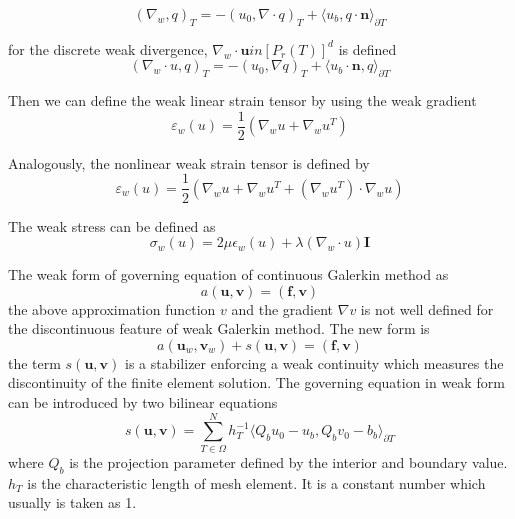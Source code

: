 \begin{equation}
(\nabla_{w}, q)_{T} = -(u_{0}, \nabla \cdot q)_{T} + \langle u_{b}, q \cdot \mathbf{n} \rangle_{\partial T}
\end{equation}

for the discrete weak divergence, $ \nabla_{w} \cdot \mathbf{u} in [P_{r} (T)]^{d} $ is defined 
\begin{equation}
(\nabla_w \cdot u, q)_{T} = -(u_{0}, \nabla q)_{T} + \langle u_{b} \cdot \mathbf{n}, q \rangle_{\partial T}
\end{equation}

Then we can define the weak linear strain tensor by using the weak gradient
\begin{equation}
\varepsilon_{w} (u) = \frac{1}{2} (\nabla_{w} u + \nabla_{w} u^{T})
\end{equation}

Analogously, the nonlinear weak strain tensor is defined by 
\begin{equation}
\varepsilon_{w} (u) = \frac{1}{2} (\nabla_{w} u + \nabla_{w} u^{T} + (\nabla_w u^{T}) \cdot \nabla_w u ) 
\end{equation}

The weak stress can be defined as
\begin{equation}
\sigma_{w} (u) = 2 \mu \epsilon_{w}(u) + \lambda(\nabla_{w} \cdot u) \mathbf{I}
\end{equation}

The weak form of governing equation of continuous Galerkin method as
\begin{equation}
a(\mathbf{u}, \mathbf{v}) = (\mathbf{f}, \mathbf{v})
\end{equation}
the above approximation function $ v $ and the gradient $ \nabla v $ is not well defined for the discontinuous feature of weak Galerkin method. The new form is 
\begin{equation}
a(\mathbf{u}_{w}, \mathbf{v}_{w}) + s(\mathbf{u}, \mathbf{v}) = (\mathbf{f}, \mathbf{v})
\end{equation}
the term $ s(\mathbf{u}, \mathbf{v}) $ is a stabilizer enforcing a weak continuity which measures the discontinuity of the finite element solution. The governing equation in weak form can be introduced by two bilinear equations
\begin{equation}
s(\mathbf{u}, \mathbf{v}) = \sum_{T\in \Omega}^{N} h_{T}^{-1} \langle Q_{b} u_{0} - u_{b}, Q_{b} v_{0} - b_{b} \rangle_{\partial T}
\end{equation}
where $ Q_{b} $ is the projection parameter defined by the interior and boundary value. $ h_{T} $ is the characteristic length of mesh element. It is a constant number which usually is taken as 1.

